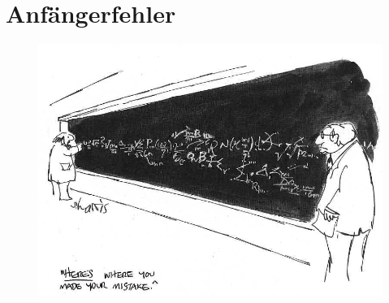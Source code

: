 \section{Anfängerfehler}

\begin{figure}[!b]
 \begin{center}
  \includegraphics[height=6.5 cm]{bilder/mistake.jpg}
 \end{center}
\end{figure}

